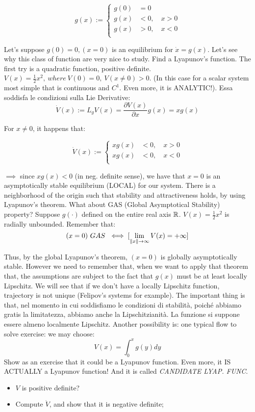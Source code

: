 \[
	g(x) := \left\{
	\begin{aligned}
	g(0) &= 0 \\
	g(x) &< 0,\quad x > 0 \\
	g(x) &>0,\quad x < 0 \\
	\end{aligned} 
	\right.
\]

Let's suppose $g(0)=0, (x=0)$ is an equilibrium for $\dot{x}=g(x)$. Let's see why this class of function are very nice to study. Find a Lyapunov's function. The first try is a quadratic function, positive definite.
$V(x)=\frac{1}{2}x^2,\ where\ V(0)=0,\ V(x\neq 0)>0$. (In this case for a scalar system most simple that is continuous and $C^1$. Even more, it is ANALYTIC!). Essa soddisfa le condizioni sulla Lie Derivative:
\[
	\dot{V}(x) := L_gV(x) = \frac{\partial{V(x)}}{\partial{x}}g(x) = xg(x)
\]

For $x \neq 0$, it happens that:
	
\[
	\dot{V}(x) := \left\{
	\begin{aligned}
	xg(x) &< 0,\quad x > 0 \\
	xg(x) &< 0,\quad x < 0 \\
	\end{aligned} 
	\right.
\]	

$\implies$ since $xg(x) < 0$ (in neg. definite sense), we have that $x=0$ is an asymptotically stable equilibrium (LOCAL) for our system. There is a neighborhood of the origin such that stability and attractiveness holds, by using Lyapunov's theorem.
What about GAS (Global Asymptotical Stability) property? Suppose $g(\mathord{\cdot})$ defined on the entire real axis $\mathbb{R}$. $V(x)=\frac{1}{2}x^2$ is radially unbounded. Remember that:
\[
	(x=0)\ GAS\ \iff [\lim_{\lVert x\rVert\to\infty}{V(x)} = +\infty]
\]

Thus, by the global Lyapunov's theorem, $(x=0)$ is globally asymptotically stable. However we need to remember that, when we want to apply that theorem that, the assumptions are subject to the fact that $g(x)$ must be at least locally Lipschitz. We will see that if we don't have a locally Lipschitz function, trajectory is not unique (Felipov's systems for example).
The important thing is that, nel momento in cui soddisfiamo le condizioni di stabilità, poiché abbiamo gratis la limitatezza, abbiamo anche la Lipschitzianità. La funzione si suppone essere almeno localmente Lipschitz. Another possibility is: one typical flow to solve exercise: we may choose:
\[
	V(x) = \int_0^x{g(y)dy}
\]
Show as an exercise that it could be a Lyapunov function. Even more, it IS ACTUALLY a Lyapunov function! And it is called \emph{CANDIDATE LYAP. FUNC}.
\begin{itemize}
\item $V$ is positive definite?
\item Compute $\dot{V}$, and show that it is negative definite;
\end{itemize}


